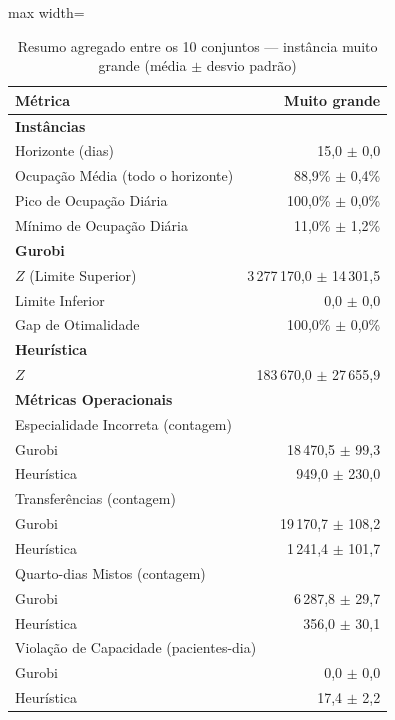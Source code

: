 \begin{table}[htbp]
    \caption{Resumo agregado entre os 10 conjuntos --- instância muito grande (média $\pm$ desvio padrão)}
    \label{tab:agregado-muito-grande}
    \centering
    \begin{adjustbox}{max width=\textwidth}
    \begin{tabular}{lr}
        \hline
        \textbf{Métrica} & \textbf{Muito grande} \\
        \hline
        \multicolumn{2}{l}{\textbf{Instâncias}} \\
        Horizonte (dias) & 15,0 $\pm$ 0,0 \\
        Ocupação Média (todo o horizonte) & 88,9\% $\pm$ 0,4\% \\
        Pico de Ocupação Diária & 100,0\% $\pm$ 0,0\% \\
        Mínimo de Ocupação Diária & 11,0\% $\pm$ 1,2\% \\
        \hline
        \multicolumn{2}{l}{\textbf{Gurobi}} \\
        $Z$ (Limite Superior) & 3\,277\,170,0 $\pm$ 14\,301,5 \\
        Limite Inferior & 0,0 $\pm$ 0,0 \\
        Gap de Otimalidade & 100,0\% $\pm$ 0,0\% \\
        \hline
        \multicolumn{2}{l}{\textbf{Heurística}} \\
        $Z$ & 183\,670,0 $\pm$ 27\,655,9 \\
        \hline
        \multicolumn{2}{l}{\textbf{Métricas Operacionais}} \\
        \multicolumn{2}{l}{Especialidade Incorreta (contagem)} \\
        \quad Gurobi & 18\,470,5 $\pm$ 99,3 \\
        \quad Heurística & 949,0 $\pm$ 230,0 \\
        \multicolumn{2}{l}{Transferências (contagem)} \\
        \quad Gurobi & 19\,170,7 $\pm$ 108,2 \\
        \quad Heurística & 1\,241,4 $\pm$ 101,7 \\
        \multicolumn{2}{l}{Quarto-dias Mistos (contagem)} \\
        \quad Gurobi & 6\,287,8 $\pm$ 29,7 \\
        \quad Heurística & 356,0 $\pm$ 30,1 \\
        \multicolumn{2}{l}{Violação de Capacidade (pacientes-dia)} \\
        \quad Gurobi & 0,0 $\pm$ 0,0 \\
        \quad Heurística & 17,4 $\pm$ 2,2 \\
        \hline
    \end{tabular}
    \end{adjustbox}
\end{table}

